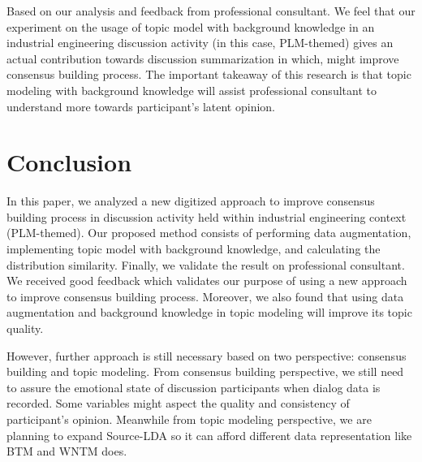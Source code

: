 \documentclass[senior]{IPSstyle}
\begin{document}
Based on our analysis and feedback from professional consultant. We feel that our experiment on the usage of topic model with background knowledge in an industrial engineering discussion activity (in this case, PLM-themed) gives an actual contribution towards discussion summarization in which, might improve consensus building process. The important takeaway of this research is that topic modeling with background knowledge will assist professional consultant to understand more towards participant’s latent opinion.

\chapter{Conclusion} 

In this paper, we analyzed a new digitized approach to improve consensus building process in discussion activity held within industrial engineering context (PLM-themed). Our proposed method consists of performing data augmentation, implementing topic model with background knowledge, and calculating the distribution similarity. Finally, we validate the result on professional consultant. We received good feedback which validates our purpose of using a new approach to improve consensus building process. Moreover, we also found that using data augmentation and background knowledge in topic modeling will improve its topic quality.

However, further approach is still necessary based on two perspective: consensus building and topic modeling. From consensus building perspective, we still need to assure the emotional state of discussion participants when dialog data is recorded. Some variables might aspect the quality and consistency of participant’s opinion. Meanwhile from topic modeling perspective, we are planning to expand Source-LDA so it can afford different data representation like BTM and WNTM does.



\end{document}
